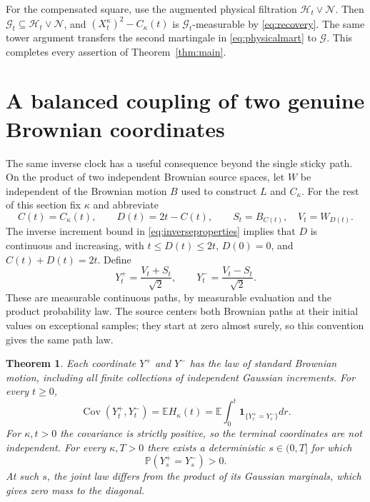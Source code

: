 \documentclass[11pt]{article}
\newtheorem{theorem}{Theorem}[section]
\newcommand{\E}{\mathbb E}
\newcommand{\Pp}{\mathbb P}
\newcommand{\ind}{\mathbf1}
\newcommand{\G}{\mathcal G}
\newcommand{\N}{\mathcal N}
\begin{document}
For the compensated square, use the augmented physical filtration
$\mathcal H_t\vee\N$. Then $\G_t\subseteq\mathcal H_t\vee\N$,
and $(X_t^\kappa)^2-C_\kappa(t)$ is $\G_t$-measurable by
\eqref{eq:recovery}. The same tower argument transfers the second
martingale in \eqref{eq:physicalmart} to $\G$. This completes every
assertion of Theorem~\ref{thm:main}.

\section{A balanced coupling of two genuine Brownian coordinates}
The same inverse clock has a useful consequence beyond the single
sticky path. On the product of two independent Brownian source spaces,
let $W$ be independent of the Brownian motion $B$ used to construct
$L$ and $C_\kappa$. For the rest of this section fix $\kappa$ and abbreviate
\[
 C(t)=C_\kappa(t),\qquad D(t)=2t-C(t),\qquad
 S_t=B_{C(t)},\quad V_t=W_{D(t)}.
\]
The inverse increment bound in \eqref{eq:inverseproperties} implies
that $D$ is continuous and increasing, with $t\leq D(t)\leq2t$,
$D(0)=0$, and $C(t)+D(t)=2t$. Define
\begin{equation}\label{eq:pair}
 Y_t^+=\frac{V_t+S_t}{\sqrt2},\qquad
 Y_t^-=\frac{V_t-S_t}{\sqrt2}.
\end{equation}
These are measurable continuous paths, by measurable evaluation and
the product probability law. The source centers both Brownian paths
at their initial values on exceptional samples; they start at zero
almost surely, so this convention gives the same path law.

\begin{theorem}\label{thm:pair}
Each coordinate $Y^+$ and $Y^-$ has the law of standard Brownian
motion, including all finite collections of independent Gaussian
increments. For every $t\geq0$,
\begin{equation}\label{eq:paircov}
 \operatorname{Cov}(Y_t^+,Y_t^-)
 =\E H_\kappa(t)
 =\E\int_0^t\ind_{\{Y_r^+=Y_r^-\}}dr.
\end{equation}
For $\kappa,t>0$ the covariance is strictly positive, so the terminal
coordinates are not independent. For every $\kappa,T>0$ there exists
a deterministic $s\in(0,T]$ for which
\begin{equation}\label{eq:diagonal}
 \Pp(Y_s^+=Y_s^-)>0.
\end{equation}
At such $s$, the joint law differs from the product of its Gaussian
marginals, which gives zero mass to the diagonal.
\end{theorem}
\end{document}
